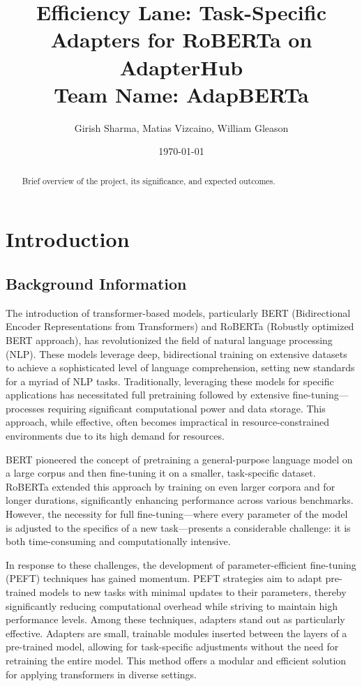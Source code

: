 \documentclass[12pt]{article}
\begin{document}
\title{Efficiency Lane: Task-Specific Adapters for RoBERTa on AdapterHub\\
{\large Team Name: AdapBERTa}}
\author{Girish Sharma, Matias Vizcaino, William Gleason}
\date{\today}
\maketitle

\begin{abstract}
Brief overview of the project, its significance, and expected outcomes.
\end{abstract}

\tableofcontents
\listoffigures
\listoftables


\section{Introduction}

\subsection{Background Information}

The introduction of transformer-based models, particularly BERT (Bidirectional Encoder Representations from Transformers) and RoBERTa (Robustly optimized BERT approach), has revolutionized the field of natural language processing (NLP). These models leverage deep, bidirectional training on extensive datasets to achieve a sophisticated level of language comprehension, setting new standards for a myriad of NLP tasks. Traditionally, leveraging these models for specific applications has necessitated full pretraining followed by extensive fine-tuning—processes requiring significant computational power and data storage. This approach, while effective, often becomes impractical in resource-constrained environments due to its high demand for resources.

BERT pioneered the concept of pretraining a general-purpose language model on a large corpus and then fine-tuning it on a smaller, task-specific dataset. RoBERTa extended this approach by training on even larger corpora and for longer durations, significantly enhancing performance across various benchmarks. However, the necessity for full fine-tuning—where every parameter of the model is adjusted to the specifics of a new task—presents a considerable challenge: it is both time-consuming and computationally intensive.

In response to these challenges, the development of parameter-efficient fine-tuning (PEFT) techniques has gained momentum. PEFT strategies aim to adapt pre-trained models to new tasks with minimal updates to their parameters, thereby significantly reducing computational overhead while striving to maintain high performance levels. Among these techniques, adapters stand out as particularly effective. Adapters are small, trainable modules inserted between the layers of a pre-trained model, allowing for task-specific adjustments without the need for retraining the entire model. This method offers a modular and efficient solution for applying transformers in diverse settings.
\end{document}
